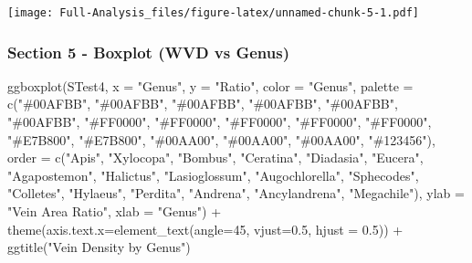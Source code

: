 \documentclass[
]{article}
\newenvironment{Shaded}{\begin{snugshade}}{\end{snugshade}}
\newcommand{\AttributeTok}[1]{\textcolor[rgb]{0.77,0.63,0.00}{#1}}
\newcommand{\DecValTok}[1]{\textcolor[rgb]{0.00,0.00,0.81}{#1}}
\newcommand{\FloatTok}[1]{\textcolor[rgb]{0.00,0.00,0.81}{#1}}
\newcommand{\FunctionTok}[1]{\textcolor[rgb]{0.00,0.00,0.00}{#1}}
\newcommand{\NormalTok}[1]{#1}
\newcommand{\SpecialCharTok}[1]{\textcolor[rgb]{0.00,0.00,0.00}{#1}}
\newcommand{\StringTok}[1]{\textcolor[rgb]{0.31,0.60,0.02}{#1}}
\begin{document}
\texttt{[image: Full-Analysis\_files/figure-latex/unnamed-chunk-5-1.pdf]}

\hypertarget{section-5---boxplot-wvd-vs-genus}{%
\subsubsection{Section 5 - Boxplot (WVD vs
Genus)}\label{section-5---boxplot-wvd-vs-genus}}

\begin{Shaded}
\begin{Highlighting}[]
\FunctionTok{ggboxplot}\NormalTok{(STest4, }\AttributeTok{x =} \StringTok{"Genus"}\NormalTok{, }\AttributeTok{y =} \StringTok{"Ratio"}\NormalTok{, }
          \AttributeTok{color =} \StringTok{"Genus"}\NormalTok{, }\AttributeTok{palette =} \FunctionTok{c}\NormalTok{(}\StringTok{"\#00AFBB"}\NormalTok{, }\StringTok{"\#00AFBB"}\NormalTok{, }\StringTok{"\#00AFBB"}\NormalTok{, }\StringTok{"\#00AFBB"}\NormalTok{, }\StringTok{"\#00AFBB"}\NormalTok{, }\StringTok{"\#00AFBB"}\NormalTok{, }\StringTok{"\#FF0000"}\NormalTok{, }\StringTok{"\#FF0000"}\NormalTok{, }\StringTok{"\#FF0000"}\NormalTok{, }\StringTok{"\#FF0000"}\NormalTok{, }\StringTok{"\#FF0000"}\NormalTok{, }\StringTok{"\#E7B800"}\NormalTok{, }\StringTok{"\#E7B800"}\NormalTok{, }\StringTok{"\#00AA00"}\NormalTok{, }\StringTok{"\#00AA00"}\NormalTok{, }\StringTok{"\#00AA00"}\NormalTok{, }\StringTok{"\#123456"}\NormalTok{),}
          \AttributeTok{order =} \FunctionTok{c}\NormalTok{(}\StringTok{"Apis"}\NormalTok{, }\StringTok{"Xylocopa"}\NormalTok{, }\StringTok{"Bombus"}\NormalTok{, }\StringTok{"Ceratina"}\NormalTok{, }\StringTok{"Diadasia"}\NormalTok{, }\StringTok{"Eucera"}\NormalTok{, }\StringTok{"Agapostemon"}\NormalTok{, }\StringTok{"Halictus"}\NormalTok{, }\StringTok{"Lasioglossum"}\NormalTok{, }\StringTok{"Augochlorella"}\NormalTok{, }\StringTok{"Sphecodes"}\NormalTok{, }\StringTok{"Colletes"}\NormalTok{, }\StringTok{"Hylaeus"}\NormalTok{, }\StringTok{"Perdita"}\NormalTok{, }\StringTok{"Andrena"}\NormalTok{, }\StringTok{"Ancylandrena"}\NormalTok{, }\StringTok{"Megachile"}\NormalTok{),}
          \AttributeTok{ylab =} \StringTok{"Vein Area Ratio"}\NormalTok{, }\AttributeTok{xlab =} \StringTok{"Genus"}\NormalTok{) }\SpecialCharTok{+}
          \FunctionTok{theme}\NormalTok{(}\AttributeTok{axis.text.x=}\FunctionTok{element\_text}\NormalTok{(}\AttributeTok{angle=}\DecValTok{45}\NormalTok{, }\AttributeTok{vjust=}\FloatTok{0.5}\NormalTok{, }\AttributeTok{hjust =} \FloatTok{0.5}\NormalTok{)) }\SpecialCharTok{+}
          \FunctionTok{ggtitle}\NormalTok{(}\StringTok{"Vein Density by Genus"}\NormalTok{)}
\end{Highlighting}
\end{Shaded}
\end{document}

